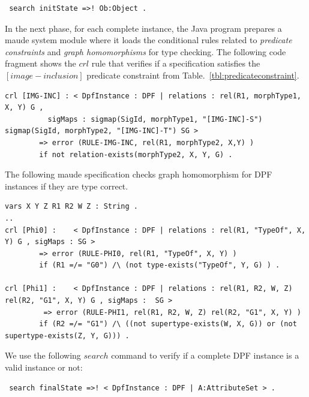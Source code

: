 \documentclass{eceasst}
\begin{document}
\begin{center}
\begin{verbatim}
 search initState =>! Ob:Object .
\end{verbatim}
\end{center}

In the next phase, for each complete instance, the Java program prepares a maude system module where it loads the conditional rules related to \textit{predicate constraints} 
and \textit{graph homomorphisms} for type checking. The following code fragment shows the $crl$ rule that verifies if a specification satisfies the $[image-inclusion]$ predicate constraint from 
Table.~\ref{tbl:predicateconstraint}. 

\tiny
\begin{verbatim}
crl [IMG-INC] :	< DpfInstance : DPF | relations : rel(R1, morphType1, X, Y) G , 
		  sigMaps : sigmap(SigId, morphType1, "[IMG-INC]-S") sigmap(SigId, morphType2, "[IMG-INC]-T") SG > 
		=> error (RULE-IMG-INC, rel(R1, morphType2, X,Y) )
		if not relation-exists(morphType2, X, Y, G) .
\end{verbatim}
\normalsize



The following maude specification checks graph homomorphism for DPF instances if they are type correct. 


\tiny
\begin{verbatim}
vars X Y Z R1 R2 W Z : String .
..
crl [Phi0] :	< DpfInstance : DPF | relations : rel(R1, "TypeOf", X, Y) G , sigMaps : SG > 
		=> error (RULE-PHI0, rel(R1, "TypeOf", X, Y) )
		if (R1 =/= "G0") /\ (not type-exists("TypeOf", Y, G) ) .

crl [Phi1] :	< DpfInstance : DPF | relations : rel(R1, R2, W, Z) rel(R2, "G1", X, Y) G , sigMaps :  SG > 
		 => error (RULE-PHI1, rel(R1, R2, W, Z) rel(R2, "G1", X, Y) )
		if (R2 =/= "G1") /\ ((not supertype-exists(W, X, G)) or (not supertype-exists(Z, Y, G))) .
\end{verbatim}

\normalsize


We use the following $search$ command to verify if a complete DPF instance is a valid instance or not:

\begin{center}
\begin{verbatim}
 search finalState =>! < DpfInstance : DPF | A:AttributeSet > .
\end{verbatim}
\end{center}
\end{document}
